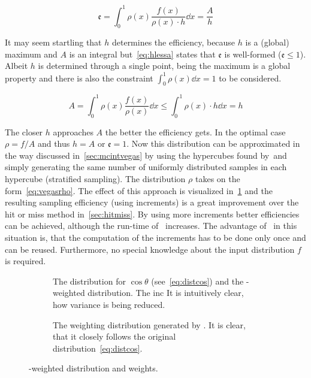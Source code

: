 \begin{equation}
  \label{eq:strateff}
  \mathfrak{e} = \int_0^1\rho(x)\frac{f(x)}{\rho(x)\cdot h}\dd{x} = \frac{A}{h}
\end{equation}

It may seem startling that \(h\) determines the efficiency, because
\(h\) is a (global) maximum and \(A\) is an integral
but~\eqref{eq:hlessa} states that \(\mathfrak{e}\) is well-formed
(\(\mathfrak{e}\leq 1\)). Albeit \(h\) is determined through a single
point, being the maximum is a global property and there is also the
constraint \(\int_0^1\rho(x)\dd{x}=1\) to be considered.

\begin{equation}
  \label{eq:hlessa}
  A = \int_0^1\rho(x)\frac{f(x)}{\rho(x)}\dd{x} \leq
  \int_0^1\rho(x)\cdot h\dd{x} = h
\end{equation}

The closer \(h\) approaches \(A\) the better the efficiency gets. In
the optimal case \(\rho=f/A\) and thus \(h=A\) or
\(\mathfrak{e} = 1\). Now this distribution can be approximated in the
way discussed in~\ref{sec:mcintvegas} by using the hypercubes found
by~\vegas and simply generating the same number of uniformly
distributed samples in each hypercube (stratified sampling). The
distribution \(\rho\) takes on the form~\eqref{eq:vegasrho}. The
effect of this approach is visualized in~\ref{fig:vegasdist} and the
resulting sampling efficiency  (using
 increments) is a great
improvement over the hit or miss method in~\ref{sec:hitmiss}. By using
more increments better efficiencies can be achieved, although the
run-time of \vegas\ increases. The advantage of \vegas\ in this
situation is, that the computation of the increments has to be done
only once and can be reused. Furthermore, no special knowledge about
the input distribution \(f\) is required.


\begin{figure}[ht]
  \centering
  \begin{subfigure}{.49\textwidth}
    \caption[The distribution for \(\cos\theta\), derived from the
    differential cross-section and the \vegas-weighted
    distribution]{\label{fig:vegasdist} The distribution for
      \(\cos\theta\) (see~\eqref{eq:distcos}) and the \vegas-weighted
      distribution. The inc It is intuitively clear, how variance is
      being reduced.}
  \end{subfigure}
  \begin{subfigure}{.49\textwidth}
    \caption[The weighting distribution generated by
    \vegas.]{\label{fig:vegasrho} The weighting distribution generated
      by \vegas. It is clear, that it closely follows the original
      distribution~\eqref{eq:distcos}.}
  \end{subfigure}
  \caption{\label{fig:vegas-weighting} \vegas-weighted distribution
    and weights.}
\end{figure}

